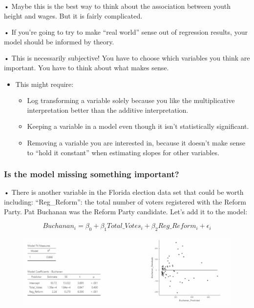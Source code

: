 \documentclass[
  letterpaper,
  DIV=11,
  numbers=noendperiod]{scrreprt}
\begin{document}
• Maybe this is the best way to think about the association between
youth height and wages. But it is fairly complicated.

• If you're going to try to make ``real world'' sense out of regression
results, your model should be informed by theory.

• This is necessarily subjective! You have to choose which variables you
think are important. You have to think about what makes sense.

\begin{itemize}
\item
  This might require:

  \begin{itemize}
  \item
    Log transforming a variable solely because you like the
    multiplicative interpretation better than the additive
    interpretation.
  \item
    Keeping a variable in a model even though it isn't statistically
    significant.
  \item
    Removing a variable you are interested in, because it doesn't make
    sense to ``hold it constant'' when estimating slopes for other
    variables.
  \end{itemize}
\end{itemize}

\hypertarget{is-the-model-missing-something-important}{%
\subsubsection{Is the model missing something
important?}\label{is-the-model-missing-something-important}}

• There is another variable in the Florida election data set that could
be worth including: ``Reg\_Reform'': the total number of voters
registered with the Reform Party. Pat Buchanan was the Reform Party
candidate. Let's add it to the model:

\[
Buchanan_i = \beta_0 + \beta_1Total\_Votes_i + \beta_2Reg\_Reform_i + \epsilon_i
\]

\begin{figure}

{\centering \includegraphics{images/mod4_pt2_18.png}

}

\end{figure}
\end{document}
